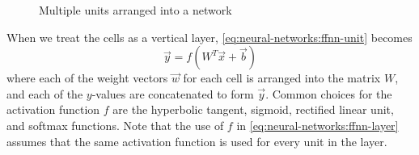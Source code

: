 \begin{figure}[h]
    \centering
    \caption{Multiple units arranged into a network}\label{fig:neural-networks:multilayer-perceptron}
\end{figure}

When we treat the cells as a vertical layer, \autoref{eq:neural-networks:ffnn-unit} becomes
\begin{equation}
    \vec y = f(W^T \vec x + \vec b) \label{eq:neural-networks:ffnn-layer}
\end{equation}
where each of the weight vectors $\vec w$ for each cell is arranged into the matrix $W$, and each of the $y$-values are concatenated to form $\vec y$.
Common choices for the activation function $f$ are the hyperbolic tangent, sigmoid, rectified linear unit, and softmax functions.
Note that the use of $f$ in \autoref{eq:neural-networks:ffnn-layer} assumes that the same activation function is used for every unit in the layer.


